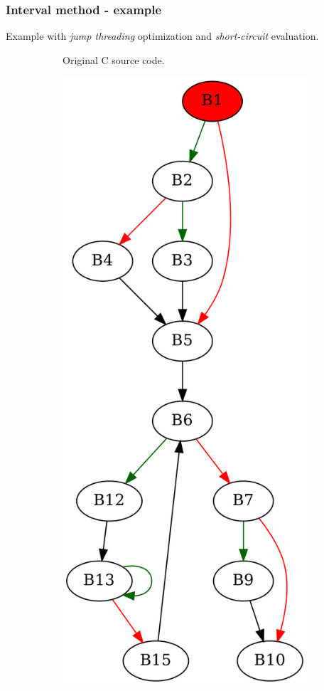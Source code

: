 \documentclass[aspectratio=1610]{beamer}
\begin{document}
\begin{frame}[noframenumbering]
	\frametitle{Interval method - example}
	Example with \textit{jump threading} optimization and \textit{short-circuit} evaluation.
	\begin{figure}[htbp]
		\centering
		\begin{subfigure}[b]{0.30\textwidth}
			\centering
			
			\caption{Original C source code.}
		\end{subfigure}
		\begin{subfigure}[b]{0.50\textwidth}
			\centering
			\includegraphics[height=0.6\paperheight]{inc/methods/interval/example/sample/f_0005b.png}

\end{subfigure}
\end{figure}
\end{frame}
\end{document}
